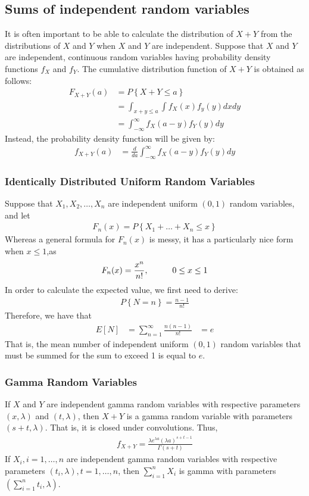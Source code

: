 \documentclass[a4paper]{article}
\begin{document}
\subsection{Sums of independent random variables} %
\label{sub:Sums of independent random variables}
It is often important to be able to calculate the distribution of $X+Y$ from the distributions of $X$ and $Y$ when $X$ and $Y$ are independent. Suppose that $X$ and $Y$ are independent, continuous random variables having probability density functions $f_X$ and $f_Y$. The cumulative distribution function of $X+Y$ is obtained as follows:
\begin{align}
  F_{X+Y}(a) &= P\left\{ X+Y \leq a\right\} \\
  & = \int_{x+y \leq a}\int f_X(x)f_y(y) dxdy \\
  & = \int_{-\infty}^{\infty} f_X(a-y)f_Y(y) dy 
\end{align}
Instead, the probability density function will be given by:
\begin{align}
  f_{X+Y}(a) & = \frac{d}{da} \int_{-\infty}^{\infty} f_X(a-y)f_Y(y) dy
\end{align}
\subsubsection{Identically Distributed Uniform Random Variables} 
Suppose that $X_1,X_2,\dots,X_n$ are independent uniform $(0,1)$ random variables, and let 
\begin{align}
  F_n(x) = P\left\{ X_1+\dots+X_n \leq x \right\}
\end{align}
Whereas a general formula for $F_n(x)$ is messy, it has a particularly nice form when $x\leq1$,as
\begin{align}
  F_n(x)=\frac{x^n}{n!}, \hspace{1 cm} 0 \leq x \leq 1
\end{align}
In order to calculate the expected value, we first need to derive:
\begin{align}
  P\left\{ N=n \right\} = \frac{n-1}{n!}
\end{align}
Therefore, we have that
\begin{align}
  E[N] & = \sum_{n=1}^{\infty} \frac{n(n-1)}{n!} 
  & = e
\end{align}
That is, the mean number of independent uniform $(0,1)$ random variables that must be summed for the sum to exceed 1 is equal to $e$.
\subsubsection{Gamma Random Variables}
If $X$ and $Y$ are independent gamma random variables with respective parameters $(x,\lambda)$ and $(t,\lambda)$, then $X+Y$ is a gamma random variable with parameters $(s+t,\lambda)$. That is, it is closed under convolutions. Thus,
\begin{align}
  f_{X+Y} = \frac{\lambda e^{\lambda a}(\lambda a)^{s+t-1}}{\Gamma(s+t)}
\end{align}
If $X_i,i=1,\dots,n$ are independent gamma random variables with respective parameters $(t_i,\lambda),t=1,\dots,n$, then $\sum_{i=1}^{n}X_i$ is gamma with parameters $(\sum_{i=1}^{n}t_i,\lambda)$.
\end{document}
